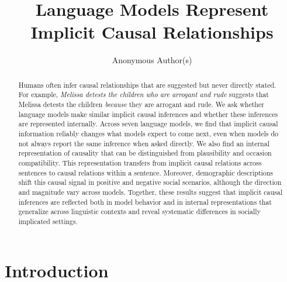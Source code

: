\documentclass[11pt]{article}
\title{Language Models Represent Implicit Causal Relationships}
\author{Anonymous Author(s)}
\begin{document}
\maketitle

\begin{abstract}
Humans often infer causal relationships that are suggested but never directly stated. For example, \emph{Melissa detests the children who are arrogant and rude}
suggests that Melissa detests the children \emph{because} they are arrogant and rude. We ask whether language models make similar implicit causal inferences and whether these inferences are represented internally. Across seven language models, we find that implicit causal information reliably changes what models expect to come next, even when models do not always report the same inference when asked directly. We also find an internal representation of causality that can be distinguished from plausibility and occasion compatibility. This representation transfers from implicit causal relations across sentences to causal relations within a sentence. Moreover, demographic descriptions shift this causal signal in positive and negative social scenarios, although the direction and magnitude vary across models. Together, these results suggest that implicit causal inferences are reflected both in model behavior and in internal representations that generalize across linguistic contexts and reveal systematic differences in socially implicated settings.

\end{abstract}

\section{Introduction}
\label{sec:introduction}
\end{document}
